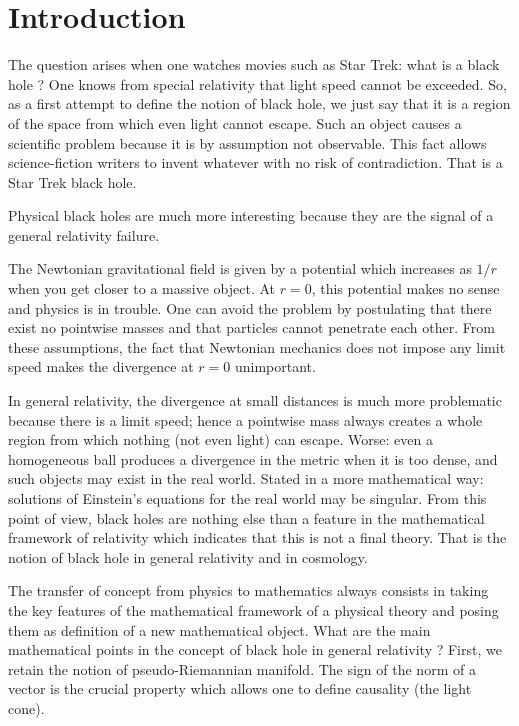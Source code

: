 \section{Introduction}

The question arises when one watches movies such as Star Trek: what is a black hole ? One knows from special relativity that light speed cannot be exceeded. So, as a first attempt to define the notion of black hole, we just say that it is a region of the space from which even light cannot escape. Such an object causes a scientific problem because it is by assumption not observable. This fact allows science-fiction writers to invent whatever with no risk of contradiction. That is a Star Trek black hole.

Physical black holes are much more interesting because they are the signal of a general relativity failure.

The Newtonian gravitational field is given by a potential which increases as $1/r$ when you get closer to a massive object. At $r=0$, this potential makes no sense and physics is in trouble. One can avoid the problem by postulating that there exist no pointwise masses and that particles cannot penetrate each other. From these assumptions, the fact that Newtonian mechanics does not impose any limit speed makes the divergence at $r=0$ unimportant.

In general relativity, the divergence at small distances is much more problematic because there is a limit speed; hence a pointwise mass always creates a whole region from which nothing (not even light) can escape. Worse: even a homogeneous ball produces a divergence in the metric when it is too dense, and such objects may exist in the real world. Stated in a more mathematical way: solutions of Einstein's equations for the real world may be singular. From this point of view, black holes are nothing else than a feature in the mathematical framework of relativity which indicates that this is not a final theory. That is the notion of black hole in general relativity and in cosmology.

The transfer of concept from physics to mathematics always consists in taking the key features of the mathematical framework of a physical theory and posing them as definition of a new mathematical object. What are the main mathematical points in the concept of black hole in general relativity ? 
First, we retain the notion of pseudo-Riemannian manifold. The sign of the norm of a vector is the crucial property which allows one to define causality (the light cone).


